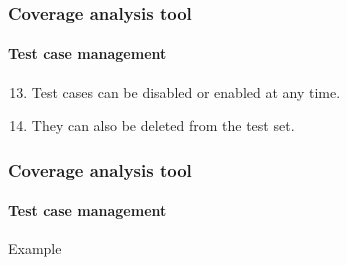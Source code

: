 \begin{frame}[parent={cmap:coverage-analysis-tool},hasnext=true,hasprev=true]
\frametitle{Coverage analysis tool}
\framesubtitle{Test case management}
\label{concept:jabuti-test-case-management}

\begin{block:procedure}{}
\begin{enumerate}
	\setcounter{enumi}{12}
	\item Test cases can be disabled or enabled at any time.

	\item They can also be deleted from the test set.
\end{enumerate}
\end{block:procedure}
\end{frame}



\begin{frame}[c]
\frametitle{Coverage analysis tool}
\framesubtitle{Test case management}

\begin{block}{Example}
\end{block}
\end{frame}

